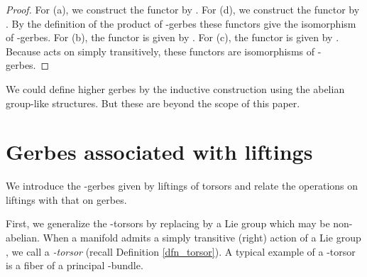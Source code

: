 \documentclass[a4paper,a4paper]{article}
\theoremstyle{definition}
\theoremstyle{remark}
\providecommand{\T}{\mathbb{T}}
\providecommand{\sC}{\mathcal{C}}
\providecommand{\sT}{\mathcal{T}}
\begin{document}
\begin{proof}
For (a), we construct the functor by \coordHE{}. For (d), we construct the functor by \coordHE{}. By the definition of the product of \myHighlight{$\T$}\coordHE{}-gerbes these functors give the isomorphism of \myHighlight{$\T$}\coordHE{}-gerbes. For (b), the functor \myHighlight{$\sC \odot \sT \to \sC$}\coordHE{} is given by \coordHE{}. For (c), the functor \myHighlight{$\sC^* \odot \sC \to \sT$}\coordHE{} is given by \coordHE{}. Because \myHighlight{$\sT$}\coordHE{} acts on \myHighlight{$\sC$}\coordHE{} simply transitively, these functors are isomorphisms of \myHighlight{$\T$}\coordHE{}-gerbes.
\end{proof}

We could define higher gerbes \cite{F2} by the inductive construction using the abelian group-like structures. But these are beyond the scope of this paper.


\section{Gerbes associated with liftings}
\label{la_lifting_gerbe}

We introduce the \myHighlight{$\T$}\coordHE{}-gerbes given by liftings of torsors and relate the operations on liftings with that on gerbes. 

\smallskip

First, we generalize the \myHighlight{$\T$}\coordHE{}-torsors by replacing \myHighlight{$\T$}\coordHE{} by a Lie group which may be non-abelian. When a manifold \myHighlight{$\Xi$}\coordHE{} admits a simply transitive (right) action of a Lie group \myHighlight{$\Gamma$}\coordHE{}, we call \myHighlight{$\Xi$}\coordHE{} a \textit{\myHighlight{$\Gamma$}\coordHE{}-torsor} (recall Definition \ref{dfn_torsor}). A typical example of a \myHighlight{$\Gamma$}\coordHE{}-torsor is a fiber of a principal \myHighlight{$\Gamma$}\coordHE{}-bundle.
\end{document}
